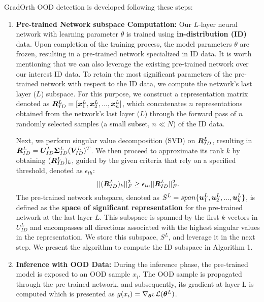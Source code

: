 \documentclass{article}
\begin{document}
GradOrth OOD detection is developed following these steps:
\begin{enumerate}
\item \textbf{Pre-trained Network subspace Computation:} Our $L$-layer neural network with learning parameter $\theta$ is trained using \textbf{in-distribution (ID)} data. Upon completion of the training process, the model parameters $\theta$ are frozen, resulting in a pre-trained network specialized in ID data. It is worth mentioning that we can also leverage the existing pre-trained network over our interest ID data. To retain the most significant parameters of the pre-trained network with respect to the ID data, we compute the network's last layer ($L$) subspace. For this purpose, we construct a representation matrix denoted as ${\bm{R}}_{ID}^L =[{\bm{x}}_{1}^L, {\bm{x}}_{2}^L, ..., {\bm{x}}_{n}^L ]$, which concatenates $n$ representations obtained from the network's last layer ($L$) through the forward pass of $n$ randomly selected samples (a small subset, $n \ll N$) of the ID data.

Next, we perform singular value decomposition (SVD) on ${\bm{R}}_{ID}^L$, resulting in ${\bm{R}}_{ID}^L ={\bm{U}}_{ID}^L{\bm{\Sigma}}_{ID}^L({\bm{V}}_{ID}^L)^T$. We then proceed to approximate its rank $k$ by obtaining $({\bm{R}}_{ID}^L)_k$, guided by the given criteria that rely on a specified threshold, denoted as $\epsilon_{th}$:
\begin{equation}\label{eq:ct1}
    ||({\bm{R}}_{ID}^L)_k||_F^2 \geq \epsilon_{th}||{\bm{R}}_{ID}^L||_F^2.
\end{equation}
The pre-trained network subspace, denoted as $S^L=span\{{\bm{u}}_{1}^L,{\bm{u}}_{2}^L, ...,{\bm{u}}_{k}^L\}$, is defined as the \textbf{space of significant representation} for the pre-trained network at the last layer $L$. This subspace is spanned by the first $k$ vectors in $U_{ID}^L$ and encompasses all directions associated with the highest singular values in the representation. 
We store this subspace, $S^L$, and leverage it in the next step. We present the algorithm to compute the ID subspace in Algorithm 1.

\item \textbf{Inference with OOD Data:}  During the inference phase, the pre-trained model is exposed to an OOD sample $x_i$. The OOD sample is propagated through the pre-trained network, and subsequently, its gradient at layer L is computed which is presented as $g (x_i)=\nabla_{{\bm{\theta}}^L} \mathcal{L}({\bm{\theta}}^L)$.


\end{enumerate}
\end{document}
